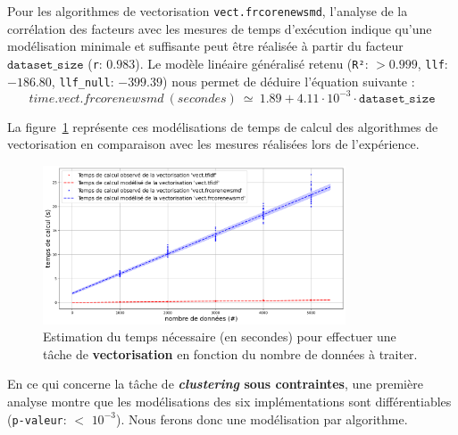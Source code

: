 			Pour les algorithmes de vectorisation \texttt{vect.frcorenewsmd}, l'analyse de la corrélation des facteurs avec les mesures de temps d'exécution indique qu'une modélisation minimale et suffisante peut être réalisée à partir du facteur $\texttt{dataset\_size}$ (\texttt{r}: $0.983$).
			Le modèle linéaire généralisé retenu (\texttt{R²}: $> 0.999$, \texttt{llf}: $-186.80$, \texttt{llf\_null}: $-399.39$) nous permet de déduire l'équation suivante :
			\begin{equation}
				time.vect.frcorenewsmd~(secondes)~
				\simeq~1.89 + 4.11 \cdot 10^{-3} \cdot \texttt{dataset\_size}
			\end{equation}
			
			La figure~\ref{figure:4.3.2-ETUDE-COUTS-TEMPS-CALCUL-MODELISATION-VECTORIZATION} représente ces modélisations de temps de calcul des algorithmes de vectorisation en comparaison avec les mesures réalisées lors de l'expérience.
			\newline
			\begin{figure}[!htb]
				\centering
				\includegraphics[width=0.8\textwidth]{figures/etude-temps-calcul-modelisation-2vect}
				\caption{Estimation du temps nécessaire (en secondes) pour effectuer une tâche de \textbf{vectorisation} en fonction du nombre de données à traiter.}
				\label{figure:4.3.2-ETUDE-COUTS-TEMPS-CALCUL-MODELISATION-VECTORIZATION}
			\end{figure}
			
			
			En ce qui concerne la tâche de \textbf{\textit{clustering} sous contraintes}, une première analyse montre que les modélisations des six implémentations sont différentiables  (\texttt{p-valeur}: $<$ \texttt{$10^{-3}$}). Nous ferons donc une modélisation par algorithme.
			
